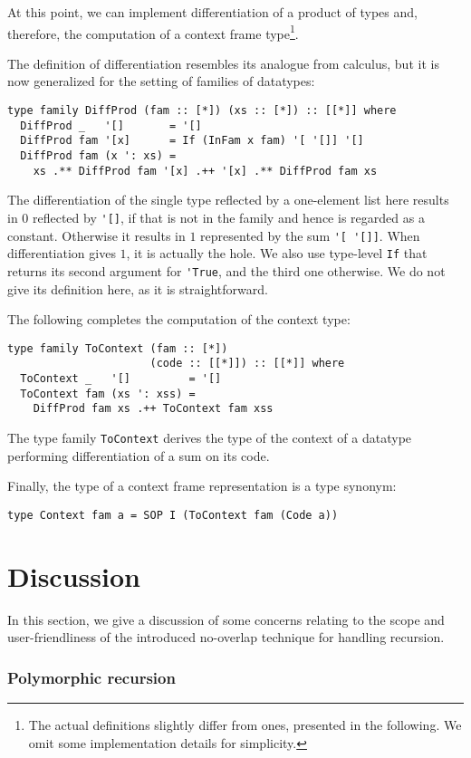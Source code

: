 \documentclass[runningheads]{llncs}
\newcommand{\K}[1]{\lstinline{#1}}
\begin{document}
At this point, we can implement differentiation of a product of types and, therefore, the computation of a context frame type\footnote{The actual definitions slightly differ from ones, presented in the following. We omit some implementation details for simplicity.}. 

The definition of differentiation resembles its analogue from calculus, but it is now generalized for the setting of families of datatypes:
\begin{lstlisting}
type family DiffProd (fam :: [*]) (xs :: [*]) :: [[*]] where
  DiffProd _   '[]       = '[]
  DiffProd fam '[x]      = If (InFam x fam) '[ '[]] '[]
  DiffProd fam (x ': xs) =
    xs .** DiffProd fam '[x] .++ '[x] .** DiffProd fam xs
\end{lstlisting}
The differentiation of the single type reflected by a one-element list here results in $0$ reflected by \K{'[]}, if that is not in the family and hence is regarded as a constant. Otherwise it results in $1$ represented by the sum \K{'[ '[]]}. When differentiation gives $1$, it is actually the hole. We also use type-level \K{If} that returns its second argument for \K{'True}, and the third one otherwise. We do not give its definition here, as it is straightforward.

The following completes the computation of the context type:
\begin{lstlisting}
type family ToContext (fam :: [*])
                      (code :: [[*]]) :: [[*]] where
  ToContext _   '[]         = '[]
  ToContext fam (xs ': xss) =
    DiffProd fam xs .++ ToContext fam xss
\end{lstlisting}
The type family \K{ToContext} derives the type of the context of a datatype performing differentiation of a sum on its code.

Finally, the type of a context frame representation is a type synonym:
\begin{lstlisting}
type Context fam a = SOP I (ToContext fam (Code a))
\end{lstlisting}


\section{Discussion}
\label{sec:discussion}

In this section, we give a discussion of some concerns relating to the scope and user-friendliness of the introduced no-overlap technique for handling recursion.

\subsubsection{Polymorphic recursion}
\end{document}

